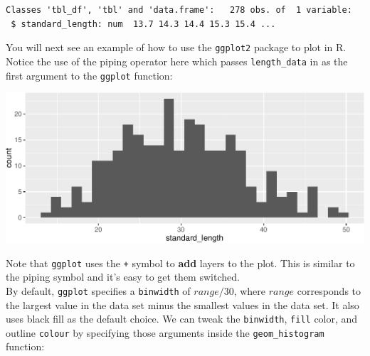 \documentclass[twoside, 12pt]{article}
\newenvironment{Shaded}{\begin{snugshade}}{\end{snugshade}}
\newcommand{\KeywordTok}[1]{\textcolor[rgb]{0.13,0.29,0.53}{\textbf{{#1}}}}
\newcommand{\DataTypeTok}[1]{\textcolor[rgb]{0.13,0.29,0.53}{{#1}}}
\newcommand{\FloatTok}[1]{\textcolor[rgb]{0.00,0.00,0.81}{{#1}}}
\newcommand{\StringTok}[1]{\textcolor[rgb]{0.31,0.60,0.02}{{#1}}}
\newcommand{\NormalTok}[1]{{#1}}
\begin{document}
\begin{Verbatim}[frame=single]
Classes 'tbl_df', 'tbl' and 'data.frame':   278 obs. of  1 variable:
 $ standard_length: num  13.7 14.3 14.4 15.3 15.4 ...
\end{Verbatim}

You will next see an example of how to use the \texttt{ggplot2} package
to plot in R. Notice the use of the piping operator here which passes
\texttt{length\_data} in as the first argument to the \texttt{ggplot}
function:

\begin{Shaded}
\end{Shaded}

\includegraphics{skeleton_files/figure-latex/unnamed-chunk-20-1.pdf}

Note that \texttt{ggplot} uses the \texttt{+} symbol to \textbf{add}
layers to the plot. This is similar to the piping symbol and it's easy
to get them switched.\\
By default, \texttt{ggplot} specifies a \texttt{binwidth} of
\(range / 30\), where \(range\) corresponds to the largest value in the
data set minus the smallest values in the data set. It also uses black
fill as the default choice. We can tweak the \texttt{binwidth},
\texttt{fill} color, and outline \texttt{colour} by specifying those
arguments inside the \texttt{geom\_histogram} function:

\begin{Shaded}
\end{Shaded}
\end{document}
